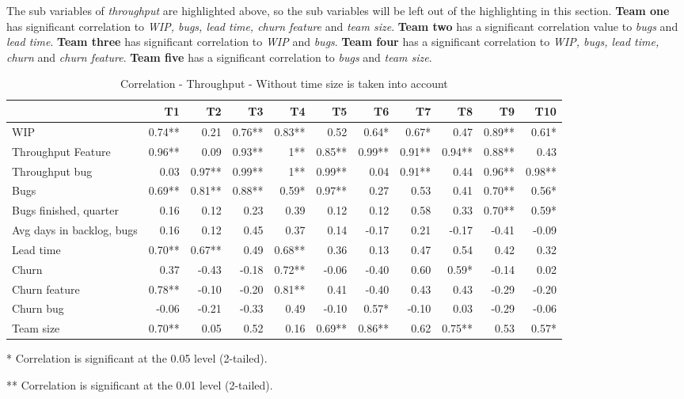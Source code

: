 \documentclass[UKenglish]{ifimaster}  %
\begin{document}
The sub variables of \textit{throughput} are highlighted above, so the sub variables will be left out of the highlighting in this section.
\textbf{Team one} has significant correlation to \textit{WIP, bugs, lead time, churn feature} and \textit{team size}. \textbf{Team two} has a significant correlation value to \textit{bugs} and \textit{lead time}. \textbf{Team three} has significant correlation to \textit{WIP} and \textit{bugs}. \textbf{Team four} has a significant correlation to \textit{WIP, bugs, lead time, churn} and \textit{churn feature}.  \textbf{Team five} has a significant correlation to \textit{bugs} and \textit{team size}.

\begin{table}[!htbp]
 \begin{adjustwidth}{-1.5cm}{}
 \centering
 \begin{tabular}{|l|r|r|r|r|r|r|r|r|r|r|}
\hline
 & \bf{T1} & \bf{T2} & \bf{T3} & \bf{T4} & \bf{T5} & \bf{T6} & \bf{T7} & \bf{T8} & \bf{T9} & \bf{T10}\\ \hline
 WIP   & 0.74** & 0.21 & 0.76** & 0.83** & 0.52 & 0.64* & 0.67* & 0.47 & 0.89** & 0.61* \\ \hline
 Throughput Feature   & 0.96** & 0.09 & 0.93** & 1** & 0.85** & 0.99** & 0.91** & 0.94** & 0.88** & 0.43 \\ \hline
 Throughput bug   & 0.03 & 0.97** & 0.99** & 1** & 0.99** & 0.04 & 0.91** & 0.44 & 0.96** & 0.98** \\ \hline
 Bugs   & 0.69** & 0.81** & 0.88** & 0.59* & 0.97** & 0.27 & 0.53 & 0.41 & 0.70** & 0.56* \\ \hline
 Bugs finished, quarter   & 0.16 & 0.12 & 0.23 & 0.39 & 0.12 & 0.12 & 0.58 & 0.33 & 0.70** & 0.59* \\ \hline
 Avg days in backlog, bugs   & 0.16 & 0.12 & 0.45 & 0.37 & 0.14 & -0.17 & 0.21 & -0.17 & -0.41 & -0.09 \\ \hline
 Lead time   & 0.70** & 0.67** & 0.49 & 0.68** & 0.36 & 0.13 & 0.47 & 0.54 & 0.42 & 0.32 \\ \hline
 Churn   & 0.37 & -0.43 & -0.18 & 0.72** & -0.06 & -0.40 & 0.60 & 0.59* & -0.14 & 0.02 \\ \hline
 Churn feature   & 0.78** & -0.10 & -0.20 & 0.81** & 0.41 & -0.40 & 0.43 & 0.43 & -0.29 & -0.20 \\ \hline
 Churn bug   & -0.06 & -0.21 & -0.33 & 0.49 & -0.10 & 0.57* & -0.10 & 0.03 & -0.29 & -0.06 \\ \hline
 Team size   & 0.70** & 0.05 & 0.52 & 0.16 & 0.69** & 0.86** & 0.62 & 0.75** & 0.53 & 0.57* \\ \hline
\end{tabular}
 \caption{Correlation - Throughput - Without time size is taken into account}
 \label{corr:TP}
 \centerline {* Correlation is significant at the 0.05 level (2-tailed).}
\centerline{** Correlation is significant at the 0.01 level (2-tailed).}
\end{adjustwidth}
\end{table}
\end{document}
